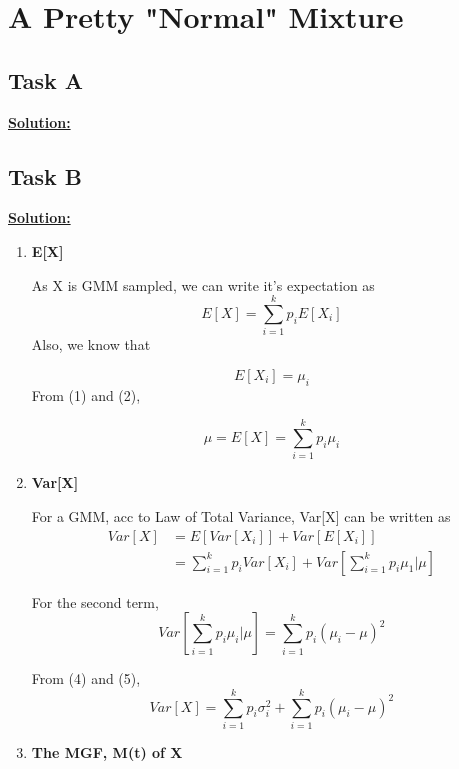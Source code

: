 \documentclass[12pt]{article}
\begin{document}
\section{A Pretty "Normal" Mixture}
\subsection{Task A}
\textbf{\underline{Solution:}}

\subsection{Task B}
\textbf{\underline{Solution:}}
\begin{enumerate}
    \item \textbf{E[X]}
    
As X is GMM sampled, we can write it’s expectation as
\begin{equation}
    E[X] = \sum_{i=1}^{k} p_iE[X_i]
\end{equation}
Also, we know that 

\begin{equation}
    E[X_i] = \mu_i
\end{equation}
From (1) and (2),

\begin{equation}
   \mu = E[X] = \sum_{i=1}^{k} p_i\mu_i
\end{equation}
    \item \textbf{Var[X]}

For a GMM, acc to Law of Total Variance, Var[X] can be written as
\begin{equation}
\begin{split}
    Var[X]& = E[Var[X_i]] + Var[E[X_i]] \\
    & = \sum_{i=1}^{k} p_iVar[X_i] + Var[\sum_{i=1}^{k} p_i\mu_1|\mu]
\end{split}
\end{equation}

For the second term, 
\begin{equation}
    Var[\sum_{i=1}^{k} p_i\mu_i|\mu] = \sum_{i=1}^{k}p_i(\mu_i - \mu)^2
\end{equation}

From (4) and (5),
\begin{equation}
    Var[X] = \sum_{i=1}^{k} p_i\sigma_i^2 + \sum_{i=1}^{k}p_i(\mu_i - \mu)^2
\end{equation}

    \item \textbf{The MGF, M(t) of X}


\end{enumerate}
\end{document}
